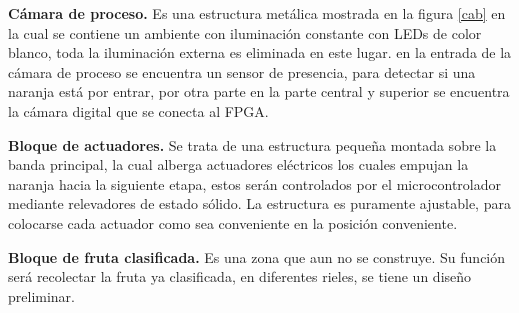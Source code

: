 \documentclass[twoside,spanish,ESP,MSc]{plantillaLabUPV}
\theoremstyle{definition}
\begin{document}

\checkmark\textbf{Cámara de proceso.} Es una estructura metálica mostrada en la figura \ref{cab} en la cual se contiene un ambiente con iluminación constante con LEDs de color blanco, toda la iluminación externa es eliminada en este lugar. en la entrada de la cámara de proceso se encuentra un sensor de presencia, para detectar si una naranja está por entrar, por otra parte en la parte central y superior se encuentra la cámara digital que se conecta al FPGA.



\checkmark\textbf{Bloque de actuadores.} Se trata de una estructura pequeña montada sobre la banda principal, la cual alberga actuadores eléctricos los cuales empujan la naranja hacia la siguiente etapa, estos serán controlados por el microcontrolador mediante relevadores de estado sólido. La estructura es puramente ajustable, para colocarse cada actuador como sea conveniente en la posición conveniente.



\checkmark\textbf{Bloque de fruta clasificada.} Es una zona que aun no se construye. Su función será recolectar la fruta ya clasificada, en diferentes rieles, se tiene un diseño preliminar.
\end{document}
